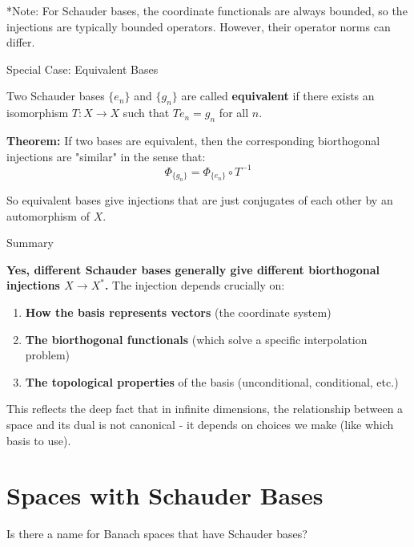 \documentclass[aps,preprint]{revtex4}
\newenvironment{question}
  {\begin{tcolorbox}[colback=blue!5!white,colframe=blue!75!black,title=Question]}
  {\end{tcolorbox}}
\newenvironment{answer}
  {\begin{tcolorbox}[colback=green!5!white,colframe=green!75!black,title=Answer]}
  {\end{tcolorbox}}
\begin{document}
\begin{answer}
*Note: For Schauder bases, the coordinate functionals are always bounded, so
the injections are typically bounded operators. However, their operator
norms can differ.

Special Case: Equivalent Bases

Two Schauder bases $\{e_n\}$ and $\{g_n\}$ are called \textbf{equivalent} if
there exists an isomorphism $T: X \to X$ such that $Te_n = g_n$ for all $n$.

\textbf{Theorem:} If two bases are equivalent, then the corresponding
biorthogonal injections are "similar" in the sense that: 
\begin{equation*}
\Phi_{\{g_n\}} = \Phi_{\{e_n\}} \circ T^{-1}
\end{equation*}

So equivalent bases give injections that are just conjugates of each other
by an automorphism of $X$.

Summary

\textbf{Yes, different Schauder bases generally give different biorthogonal
injections $X \to X^*$.} The injection depends crucially on:

\begin{enumerate}
\item \textbf{How the basis represents vectors} (the coordinate system)

\item \textbf{The biorthogonal functionals} (which solve a specific
interpolation problem)

\item \textbf{The topological properties} of the basis (unconditional,
conditional, etc.)
\end{enumerate}

This reflects the deep fact that in infinite dimensions, the relationship
between a space and its dual is not canonical - it depends on choices we
make (like which basis to use).
\end{answer}

\section{Spaces with Schauder Bases}

\begin{question}
Is there a name for Banach spaces that have Schauder bases?
\end{question}
\end{document}
